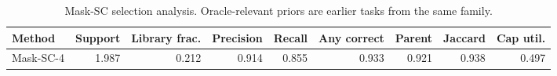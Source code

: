 \begin{table}[ht]
    \caption{Mask-SC selection analysis. Oracle-relevant priors are earlier tasks from the same family.}
    \label{tbl:masksc_selection}
    \centering
    \scriptsize
    \begin{tabular}{lrrrrrrrr}
    \toprule
Method & Support & Library frac. & Precision & Recall & Any correct & Parent & Jaccard & Cap util. \\
    \midrule
Mask-SC-4 & 1.987 & 0.212 & 0.914 & 0.855 & 0.933 & 0.921 & 0.938 & 0.497 \\
    \bottomrule
    \end{tabular}
\end{table}
